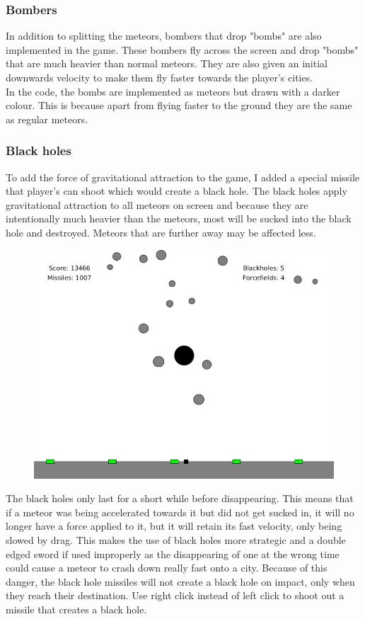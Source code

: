 \documentclass{article}
\newcommand{\n}[0]{\\[\baselineskip]}
\begin{document}
\subsubsection*{Bombers}
In addition to splitting the meteors, bombers that drop "bombs" are also implemented in the game. These bombers fly across the screen and drop "bombs" that are much heavier than normal meteors. They are also given an initial downwards velocity to make them fly faster towards the player's cities.
\n
In the code, the bombs are implemented as meteors but drawn with a darker colour. This is because apart from flying faster to the ground they are the same as regular meteors. 

\subsubsection*{Black holes}
To add the force of gravitational attraction to the game, I added a special missile that player's can shoot which would create a black hole. The black holes apply gravitational attraction to all meteors on screen and because they are intentionally much heavier than the meteors, most will be sucked into the black hole and destroyed. Meteors that are further away may be affected less.
\begin{figure}[H]
\centering
\includegraphics[width=1\textwidth]{imgs/Blackhole.png}
\end{figure}
The black holes only last for a short while before disappearing. This means that if a meteor was being accelerated towards it but did not get sucked in, it will no longer have a force applied to it, but it will retain its fast velocity, only being slowed by drag. This makes the use of black holes more strategic and a double edged sword if used improperly as the disappearing of one at the wrong time could cause a meteor to crash down really fast onto a city. Because of this danger, the black hole missiles will not create a black hole on impact, only when they reach their destination. Use right click instead of left click to shoot out a missile that creates a black hole.
 
\end{document}
